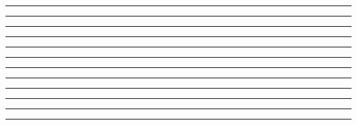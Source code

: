 \documentclass[11pt]{article}
\begin{document}
\par\nointerlineskip\noindent\hspace*{5.6mm}\rule{.4pt}{1.2mm}\hspace{1.2pt}\rule{.4pt}{1.2mm}\hspace{1.5mm}\hspace{19.93mm}\hspace{1.5mm}\rule{.4pt}{1.2mm}\hspace{1.5mm}\hspace{15.63mm}\hspace{1.5mm}\rule{.4pt}{1.2mm}\hspace{1.5mm}\hspace{16.01mm}\hspace{1.5mm}\rule{.4pt}{1.2mm}\hspace{1.2pt}\rule{.4pt}{1.2mm}\hspace{1.5mm}\hspace{16.01mm}\hspace{1.5mm}\rule{.4pt}{1.2mm}\hspace{1.5mm}\hspace{16.16mm}\hspace{1.5mm}\rule{.4pt}{1.2mm}\hspace{1.2pt}\rule{.4pt}{1.2mm}\hspace{1.5mm}\hspace{15.66mm}\hspace{1.5mm}\rule{.4pt}{1.2mm}\hspace{1.5mm}\hspace{16.16mm}\hspace{1.5mm}\rule{.4pt}{1.2mm}\hspace{1.2pt}\rule{.4pt}{1.2mm}\par\nointerlineskip
\end{document}
